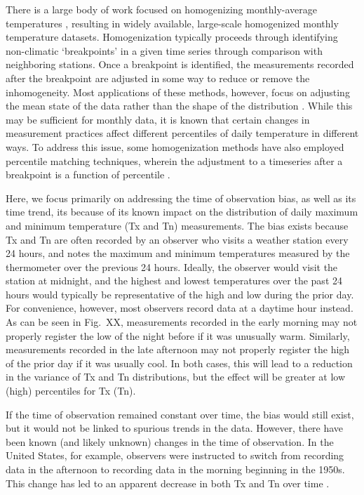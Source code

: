 \documentclass[letter]{article}
\begin{document}
There is a large body of work focused on homogenizing monthly-average temperatures \citep[e.g.,][]{karl1986model, easterling1996development, peterson1998homogeneity, ducre2003comparison, menne2009homogenization, vincent2012second}, resulting in widely available, large-scale homogenized monthly temperature datasets. Homogenization typically proceeds through identifying non-climatic `breakpoints' in a given time series through comparison with neighboring stations. Once a breakpoint is identified, the measurements recorded after the breakpoint are adjusted in some way to reduce or remove the inhomogeneity. Most applications of these methods, however, focus on adjusting the mean state of the data rather than the shape of the distribution \citep[see][and references therein]{della2006method}. While this may be sufficient for monthly data, it is known that certain changes in measurement practices affect different percentiles of daily temperature in different ways. To address this issue, some homogenization methods have also employed percentile matching techniques, wherein the adjustment to a timeseries after a breakpoint is a function of percentile \citep{della2006method, trewin2013daily}. 

Here, we focus primarily on addressing the time of observation bias, as well as its time trend, its because of its known impact on the distribution of daily maximum and minimum temperature (Tx and Tn) measurements. The bias exists because Tx and Tn are often recorded by an observer who visits a weather station every 24 hours, and notes the maximum and minimum temperatures measured by the thermometer over the previous 24 hours. Ideally, the observer would visit the station at midnight, and the highest and lowest temperatures over the past 24 hours would typically be representative of the high and low during the prior day. For convenience, however, most observers record data at a daytime hour instead. As can be seen in Fig.~XX, measurements recorded in the early morning may not properly register the low of the night before if it was unusually warm. Similarly, measurements recorded in the late afternoon may not properly register the high of the prior day if it was usually cool. In both cases, this will lead to a reduction in the variance of Tx and Tn distributions, but the effect will be greater at low (high) percentiles for Tx (Tn). 

If the time of observation remained constant over time, the bias would still exist, but it would not be linked to spurious trends in the data. However, there have been known (and likely unknown) changes in the time of observation. In the United States, for example, observers were instructed to switch from recording data in the afternoon to recording data in the morning beginning in the 1950s. This change has led to an apparent decrease in both Tx and Tn over time \citep{menne2009us}. 
\end{document}
